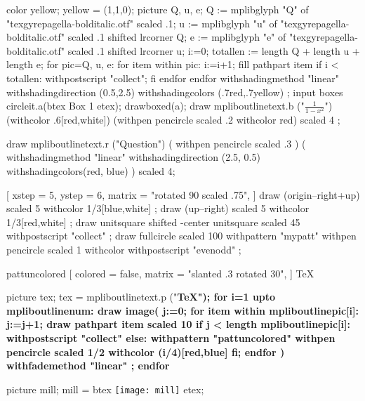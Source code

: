 \documentclass{article}
\begin{document}
\leavevmode
\mpfig
color yellow; yellow = (1,1,0);
picture Q, u, e;
Q := mplibglyph "Q" of "texgyrepagella-bolditalic.otf" scaled .1;
u := mplibglyph "u" of "texgyrepagella-bolditalic.otf" scaled .1 shifted lrcorner Q;
e := mplibglyph "e" of "texgyrepagella-bolditalic.otf" scaled .1 shifted lrcorner u;
i:=0;
totallen := length Q + length u + length e;
for pic=Q, u, e:
  for item within pic:
    i:=i+1;
    fill pathpart item
    if i < totallen: withpostscript "collect"; fi
  endfor
endfor
  withshadingmethod "linear"
  withshadingdirection (0.5,2.5)
  withshadingcolors (.7red,.7yellow)
  ;
\endmpfig
{}%
\mpfig* input boxes \endmpfig
\mpfig circleit.a(btex Box 1 etex); drawboxed(a); \endmpfig
\def\mpfiginstancename{mympfig}%
\mpfig
draw mpliboutlinetext.b ("$\displaystyle\frac{1}{1-x^2}$")
    (withcolor .6[red,white])
    (withpen pencircle scaled .2 withcolor red)
    scaled 4 ;
\endmpfig
\par
\mpfig
  draw mpliboutlinetext.r
    ("Question")
    ( withpen pencircle scaled .3 )
    (
      withshadingmethod "linear"
      withshadingdirection (2.5, 0.5)
      withshadingcolors(red, blue)
    )
    scaled 4;
\endmpfig
\par\leavevmode
{}
[
  xstep = 5, ystep = 6,
  matrix = "rotated 90 scaled .75",
]
\mpfig
draw (origin--right+up) scaled 5 withcolor 1/3[blue,white] ;
draw (up--right) scaled 5 withcolor 1/3[red,white] ;
\endmpfig
\endmppattern
\mpfig
draw unitsquare shifted -center unitsquare scaled 45 withpostscript "collect" ;
draw fullcircle scaled 100 withpattern "mypatt" withpen pencircle scaled 1
  withcolor  withpostscript "evenodd" ;
\endmpfig
\begin{mppattern}{pattuncolored}
  [
    colored = false,
    matrix = "slanted .3 rotated 30",
  ]
  \tiny\TeX
\end{mppattern}\relax
\mpfig
  picture tex;
  tex = mpliboutlinetext.p ("\bfseries \TeX");
  for i=1 upto mpliboutlinenum:
    draw image(
    j:=0;
    for item within mpliboutlinepic[i]:
      j:=j+1;
      draw pathpart item scaled 10
      if j < length mpliboutlinepic[i]:
          withpostscript "collect"
      else:
          withpattern "pattuncolored"
          withpen pencircle scaled 1/2
          withcolor (i/4)[red,blue]
      fi;
    endfor
    )
    withfademethod "linear"
    ;
  endfor
\endmpfig
\par\leavevmode
\mpfig
  picture mill; mill = btex \texttt{[image: mill]} etex;
\end{document}
